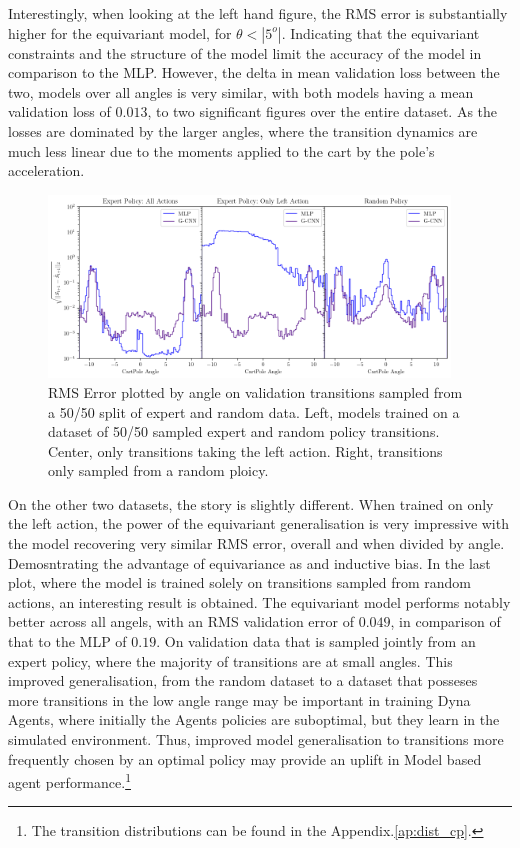 Interestingly, when looking at the left hand figure, the RMS error is substantially higher for the equivariant model, for $\theta <|5^o|$. Indicating that the equivariant constraints and the structure of the model limit the accuracy of the model in comparison to the MLP. However, the delta in mean validation loss between the two, models over all angles is very similar, with both models having a mean validation loss of $0.013$, to two significant figures over the entire dataset. As the losses are dominated by the larger angles, where the transition dynamics are much less linear due to the moments applied to the cart by the pole's acceleration.
\begin{figure}[h!]
  \label{fig:cp_model_angle}
  \begin{center}
    \includegraphics[width=0.95\textwidth]{./Figures/transition_model_cp_angle.png}
  \end{center}
  \caption{RMS Error plotted by angle on validation transitions sampled from a 50/50 split of expert and random data. Left, models trained on a dataset of 50/50 sampled expert and random policy transitions. Center, only transitions taking the left action. Right, transitions only sampled from a random ploicy.}
  \label{fig:}
\end{figure}

On the other two datasets, the story is slightly different. When trained on only the left action, the power of the equivariant generalisation is very impressive with the model recovering very similar RMS error, overall and when divided by angle. Demosntrating the advantage of equivariance as and inductive bias.
In the last plot, where the model is trained solely on transitions sampled from random actions, an interesting result is obtained. The equivariant model performs notably better across all angels, with an RMS validation error of $0.049$, in comparison of that to the MLP of $0.19$. On validation data that is sampled jointly from an expert policy, where the majority of transitions are at small angles. This improved generalisation, from the random dataset to a dataset that posseses more transitions in the low angle range may be important in training Dyna Agents, where initially the Agents policies are suboptimal, but they learn in the simulated environment. Thus, improved model generalisation to transitions more frequently chosen by an optimal policy may provide an uplift in Model based agent performance.\footnote{The transition distributions can be found in the Appendix.\ref{ap:dist_cp}.}



